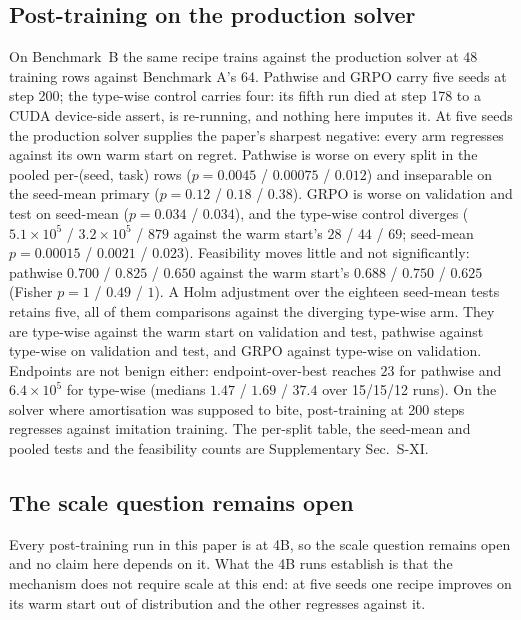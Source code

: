\documentclass[journal]{IEEEtran}
\begin{document}
\subsection{Post-training on the production solver}
\label{sec:e2B}
On Benchmark~B the same recipe trains against the production solver at $48$
training rows against Benchmark A's $64$.  Pathwise and GRPO carry five seeds at
step 200; the type-wise control carries four: its fifth run died at step 178 to a
CUDA device-side assert, is re-running, and nothing here imputes it.  At five seeds
the production solver supplies the paper's sharpest negative: every arm regresses
against its own warm start on regret.  Pathwise is worse on every split in the
pooled per-(seed, task) rows ($p=0.0045$ / $0.00075$ / $0.012$) and inseparable on
the seed-mean primary ($p=0.12$ / $0.18$ / $0.38$).  GRPO is worse on
validation and test on seed-mean ($p=0.034$ / $0.034$), and the type-wise control
diverges ($5.1\times10^{5}$ / $3.2\times10^{5}$ / $879$ against the warm start's
$28$ / $44$ / $69$; seed-mean $p=0.00015$ / $0.0021$ / $0.023$).  Feasibility moves
little and not significantly: pathwise $0.700$ / $0.825$ / $0.650$ against the warm
start's $0.688$ / $0.750$ / $0.625$ (Fisher $p=1$ / $0.49$ / $1$).  A Holm adjustment
over the eighteen seed-mean tests retains five, all of them comparisons against the
diverging type-wise arm.  They are type-wise against the warm start on validation
and test, pathwise against type-wise on validation and test, and GRPO against
type-wise on validation.  Endpoints are not benign either: endpoint-over-best reaches $23$ for
pathwise and $6.4\times10^{5}$ for type-wise (medians $1.47$ / $1.69$ / $37.4$ over
15/15/12 runs).  On the solver where amortisation was supposed to bite,
post-training at 200 steps regresses against imitation training.  The per-split
table, the seed-mean and pooled tests and the feasibility counts are Supplementary
Sec.~S-XI.


\subsection{The scale question remains open}
\label{sec:e27b}
Every post-training run in this paper is at 4B, so the scale question remains
open and no claim here depends on it.  What the 4B runs establish is that the
mechanism does not require scale at this end: at five seeds one recipe improves
on its warm start out of distribution and the other regresses against it.
\end{document}
